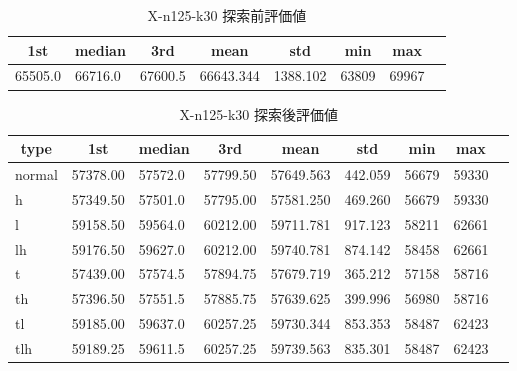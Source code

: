 \begin{table}[htbp]
    \caption{X-n125-k30 探索前評価値}
    \begin{tabular}{|l|l|l|l|l|l|l|l|}\hline
    \multicolumn{1}{|c|}{\textbf{1st}}
    &\multicolumn{1}{c|}{\textbf{median}}
    &\multicolumn{1}{c|}{\textbf{3rd}}
    &\multicolumn{1}{c|}{\textbf{mean}}
    &\multicolumn{1}{c|}{\textbf{std}}
    &\multicolumn{1}{c|}{\textbf{min}}
    &\multicolumn{1}{c|}{\textbf{max}}\\\hline
	65505.0 & 66716.0 & 67600.5 & 66643.344 & 1388.102 & 63809 & 69967\\\hline
	\end{tabular}
\end{table}
\begin{table}[htbp]
    \caption{X-n125-k30 探索後評価値}
    \begin{tabular}{|l|l|l|l|l|l|l|l|l|}\hline
    \multicolumn{1}{|c|}{\textbf{type}}
    &\multicolumn{1}{|c|}{\textbf{1st}}
    &\multicolumn{1}{c|}{\textbf{median}}
    &\multicolumn{1}{c|}{\textbf{3rd}}
    &\multicolumn{1}{c|}{\textbf{mean}}
    &\multicolumn{1}{c|}{\textbf{std}}
    &\multicolumn{1}{c|}{\textbf{min}}
    &\multicolumn{1}{c|}{\textbf{max}}\\\hline
	normal & 57378.00 & 57572.0 & 57799.50 & 57649.563 & 442.059 & 56679 & 59330\\\hline
	h & 57349.50 & 57501.0 & 57795.00 & 57581.250 & 469.260 & 56679 & 59330\\\hline
	l & 59158.50 & 59564.0 & 60212.00 & 59711.781 & 917.123 & 58211 & 62661\\\hline
	lh & 59176.50 & 59627.0 & 60212.00 & 59740.781 & 874.142 & 58458 & 62661\\\hline
	t & 57439.00 & 57574.5 & 57894.75 & 57679.719 & 365.212 & 57158 & 58716\\\hline
	th & 57396.50 & 57551.5 & 57885.75 & 57639.625 & 399.996 & 56980 & 58716\\\hline
	tl & 59185.00 & 59637.0 & 60257.25 & 59730.344 & 853.353 & 58487 & 62423\\\hline
	tlh & 59189.25 & 59611.5 & 60257.25 & 59739.563 & 835.301 & 58487 & 62423\\\hline
	\end{tabular}
\end{table}
